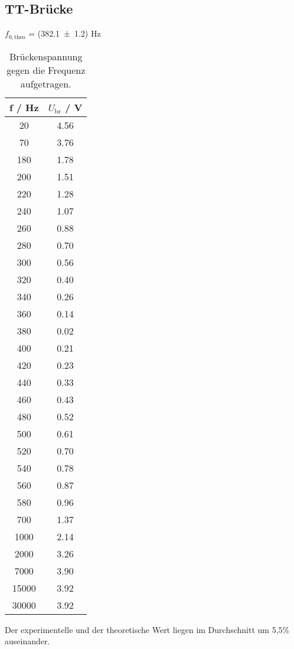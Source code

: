 \subsection{TT-Brücke}

$f_{0,\text{theo}}$ = (\num{382.1 +- 1.2}) Hz

\begin{table}[H]
  \centering
  \begin{tabular}{c c}
    \toprule
    f / Hz & $U_\text{br}$ / V \\
    \midrule
      20	  &  4.56  \\
      70	  &  3.76  \\
      180	  &  1.78  \\
      200	  &  1.51  \\
      220	  &  1.28  \\
      240	  &  1.07  \\
      260	  &  0.88  \\
      280	  &  0.70  \\
      300	  &  0.56  \\
      320	  &  0.40  \\
      340	  &  0.26  \\
      360	  &  0.14  \\
      380	  &  0.02  \\
      400	  &  0.21  \\
      420	  &  0.23  \\
      440	  &  0.33  \\
      460	  &  0.43  \\
      480	  &  0.52  \\
      500	  &  0.61  \\
      520	  &  0.70  \\
      540	  &  0.78  \\
      560	  &  0.87  \\
      580	  &  0.96  \\
      700	  &  1.37  \\
      1000	&  2.14  \\
      2000	&  3.26  \\
      7000	&  3.90  \\
      15000	&  3.92  \\
      30000	&  3.92  \\
  \end{tabular}
  \caption{Brückenspannung gegen die Frequenz aufgetragen.}
  \label{tab:Brückenspannung}
\end{table}

Der experimentelle und der theoretische Wert liegen im Durchschnitt um 5,5\% auseinander.
